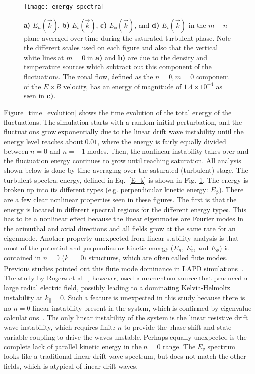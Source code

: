 \documentclass[showpacs,preprintnumbers,amsmath,amssymb,superscriptaddress,aip]{revtex4-1}
\def\para{\parallel}
\begin{document}
\begin{figure}[!htbp]
\texttt{[image: energy\_spectra]}
\hfil
\caption{\textbf{a)} $E_n(\vec{k})$, \textbf{b)} $E_t(\vec{k})$, \textbf{c)} $E_\phi(\vec{k})$, and \textbf{d)} $E_v(\vec{k})$ in the $m-n$ plane averaged over time during the saturated turbulent phase.
Note the different scales used on each figure and also that the vertical white lines at $m=0$ in \textbf{a)} and \textbf{b)} are due to the density and temperature sources which subtract out this
component of the fluctuations. The zonal flow, defined as the $n=0, m=0$ component of the $E \times B$ velocity, has an energy of magnitude of $1.4 \times 10^{-4}$ as seen in \textbf{c)}.}
\label{energy_figures}
\end{figure}

Figure~\ref{time_evolution} shows the time evolution of the total energy of the fluctuations. The simulation starts with a random initial perturbation, and the fluctuations grow
exponentially due to the linear drift wave instability until the energy level reaches about $0.01$, where the energy is fairly equally divided between $n=0$ and $n= \pm 1$ modes. 
Then, the nonlinear instability takes over and the fluctuation energy continues to grow
until reaching saturation. All analysis shown below is done by time averaging over the saturated (turbulent) stage.
The turbulent spectral energy, defined in Eq.~\ref{E_k} is shown in Fig.~\ref{energy_figures}. The energy is broken up into its different types (e.g. perpendicular kinetic energy: $E_\phi$).
There are a few clear nonlinear properties
seen in these figures. The first is that the energy is located in different spectral regions for the different energy types. This has to be a nonlinear effect because the linear eigenmodes
are Fourier modes in the azimuthal and axial directions and all fields grow at the same rate for an eigenmode. 
Another property unexpected from linear stability analysis is that most of the potential and perpendicular kinetic energy ($E_n$, $E_t$, and $E_\phi$) is contained in $n=0$ ($k_\para = 0$) 
structures, which are often called flute modes. Previous studies pointed out this flute mode dominance in LAPD simulations~\cite{rogers2010,Umansky2011}. The study by Rogers et al.~\cite{rogers2010},
however, used a momentum source that produced a large radial electric field, possibly leading to a dominating Kelvin-Helmoltz instability at $k_\para = 0$.
Such a feature is unexpected in this study because there is no $n=0$ linear instability present in the system, which is confirmed by eigenvalue calculations~\cite{Popovich2010a}.
The only linear instability of the system is the
linear resistive drift wave instability, which requires finite $n$ to provide the phase shift and state variable coupling to drive the waves unstable. Perhaps equally unexpected is the complete
lack of parallel kinetic energy in the $n=0$ range. The $E_v$ spectrum looks like a traditional linear drift wave spectrum, but does not match the other fields, which is atypical of
linear drift waves.
\end{document}

